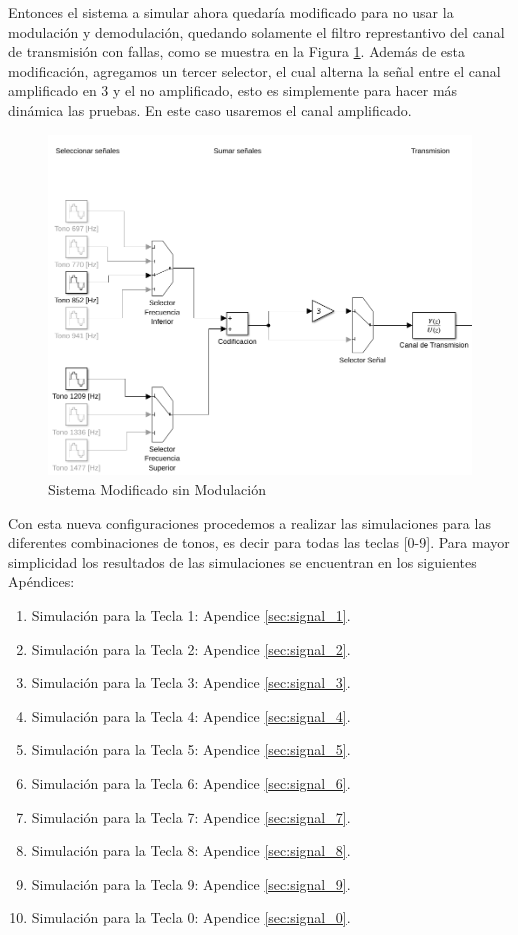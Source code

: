 Entonces el sistema a simular ahora quedaría modificado para no usar la modulación y demodulación, quedando solamente el filtro represtantivo del canal de transmisión con fallas, como se muestra en la Figura \ref{fig:falla_sim}. Además de esta modificación, agregamos un tercer selector, el cual alterna la señal entre el canal amplificado en 3 y el no amplificado, esto es simplemente para hacer más dinámica las pruebas. En este caso usaremos el canal amplificado.

\begin{figure}[!htb]
  \centering
  \includegraphics[width=400pt]{images/simulacion/fallas/sim.png}
  \caption{Sistema Modificado sin Modulación}
  \label{fig:falla_sim}
\end{figure}

Con esta nueva configuraciones procedemos a realizar las simulaciones para las diferentes combinaciones de tonos, es decir para todas las teclas [0-9]. Para mayor simplicidad los resultados de las simulaciones se encuentran en los siguientes Apéndices:
\pagebreak
\begin{enumerate}
  \item Simulación para la Tecla 1: Apendice \ref{sec:signal_1}.
  \item Simulación para la Tecla 2: Apendice \ref{sec:signal_2}.
  \item Simulación para la Tecla 3: Apendice \ref{sec:signal_3}.
  \item Simulación para la Tecla 4: Apendice \ref{sec:signal_4}.
  \item Simulación para la Tecla 5: Apendice \ref{sec:signal_5}.
  \item Simulación para la Tecla 6: Apendice \ref{sec:signal_6}.
  \item Simulación para la Tecla 7: Apendice \ref{sec:signal_7}.
  \item Simulación para la Tecla 8: Apendice \ref{sec:signal_8}.
  \item Simulación para la Tecla 9: Apendice \ref{sec:signal_9}.
  \item Simulación para la Tecla 0: Apendice \ref{sec:signal_0}.
\end{enumerate}

